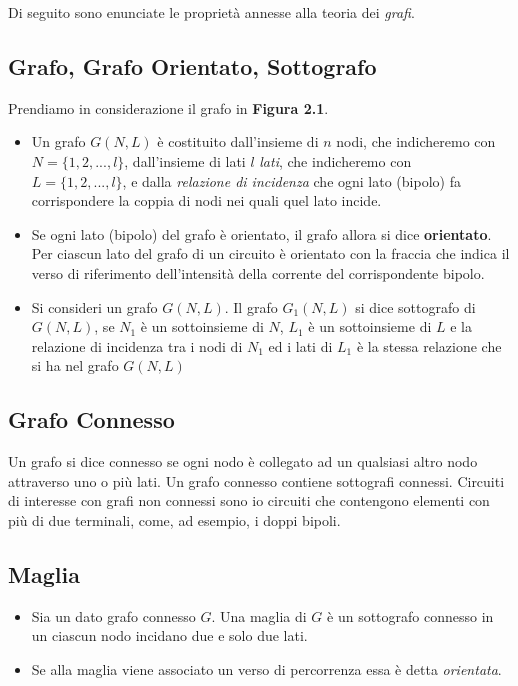 \documentclass[a4paper]{report}
\begin{document}
Di seguito sono enunciate le propriet\`a annesse alla teoria dei \emph{grafi}.
\subsection{Grafo, Grafo Orientato, Sottografo}
Prendiamo in considerazione il grafo in {\bf Figura 2.1}.

\begin{itemize}
  \item Un grafo $G(N, L)$ \`e costituito dall'insieme di $n$ nodi, che
    indicheremo con $N=\{1, 2,..., l\}$, dall'insieme di lati $l$
    \emph{lati}, che indicheremo con \\$L=\{1, 2,..., l\}$, e dalla
    \emph{relazione di incidenza} che ogni lato (bipolo) fa
    corrispondere la coppia di nodi nei quali quel lato incide.
  \item Se ogni lato (bipolo) del grafo \`e orientato, il grafo allora
    si dice {\bf orientato}. Per ciascun lato del grafo di un circuito
    \`e orientato con la fraccia che indica il verso di riferimento
    dell'intensit\`a della corrente del corrispondente bipolo.
  \item Si consideri un grafo $G(N, L)$. Il grafo $G_1(N, L)$ si dice
    sottografo di $G(N, L)$, se $N_1$ \`e un sottoinsieme di $N$,
    $L_1$ \`e un sottoinsieme di $L$ e la relazione di incidenza tra i
    nodi di $N_1$ ed i lati di $L_1$ \`e la stessa relazione che si ha
    nel grafo $G(N, L)$
\end{itemize}

\subsection{Grafo Connesso}

Un grafo si dice connesso se ogni nodo \`e collegato ad un qualsiasi
altro nodo attraverso uno o pi\`u lati.
Un grafo connesso contiene sottografi connessi. Circuiti di interesse
con grafi non connessi sono io circuiti che contengono elementi con
pi\`u di due terminali, come, ad esempio, i doppi bipoli.

\subsection{Maglia}
\begin{itemize}
\item Sia un dato grafo connesso $G$. Una maglia di $G$ \`e un sottografo
  connesso in un ciascun nodo incidano due e solo due lati.
\item Se alla maglia viene associato un verso di percorrenza essa \`e
  detta \emph{orientata}.
\end{itemize}
\end{document}
